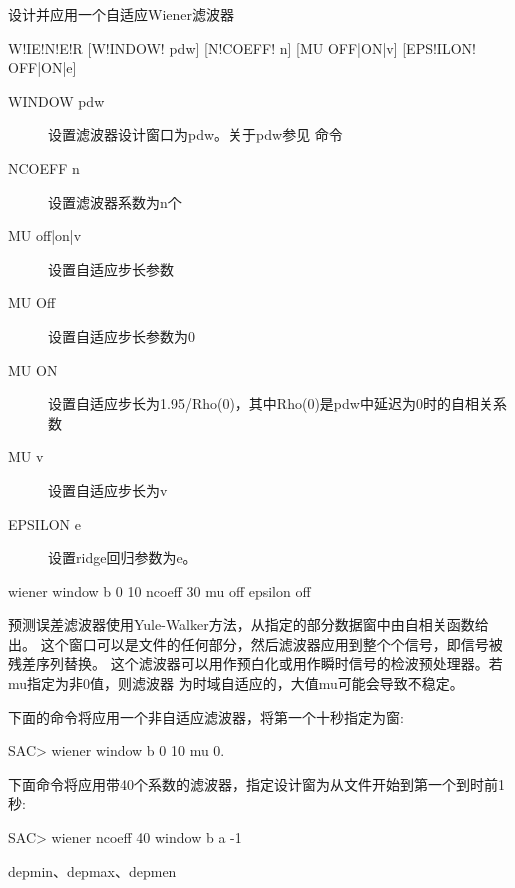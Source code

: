 \label{cmd:wiener}

设计并应用一个自适应Wiener滤波器

\begin{SACSTX}
W!IE!N!E!R [W!INDOW! pdw] [N!COEFF! n] [MU OFF|ON|v] [EPS!ILON! OFF|ON|e]
\end{SACSTX}

\begin{description}
\item [WINDOW pdw] 设置滤波器设计窗口为pdw。关于pdw参见  命令
\item [NCOEFF n] 设置滤波器系数为n个
\item [MU off|on|v] 设置自适应步长参数
\item [MU Off] 设置自适应步长参数为0
\item [MU ON] 设置自适应步长为1.95/Rho(0)，其中Rho(0)是pdw中延迟为0时的自相关系数
\item [MU v] 设置自适应步长为v
\item [EPSILON e] 设置ridge回归参数为e。
\end{description}

\begin{SACDFT}
wiener window b 0 10 ncoeff 30 mu off epsilon off
\end{SACDFT}

预测误差滤波器使用Yule-Walker方法，从指定的部分数据窗中由自相关函数给出。
这个窗口可以是文件的任何部分，然后滤波器应用到整个个信号，即信号被残差序列替换。
这个滤波器可以用作预白化或用作瞬时信号的检波预处理器。若mu指定为非0值，则滤波器
为时域自适应的，大值mu可能会导致不稳定。

下面的命令将应用一个非自适应滤波器，将第一个十秒指定为窗:
\begin{SACCode}
SAC> wiener window b 0 10 mu 0.
\end{SACCode}

下面命令将应用带40个系数的滤波器，指定设计窗为从文件开始到第一个到时前1秒:
\begin{SACCode}
SAC> wiener ncoeff 40 window b a -1
\end{SACCode}

depmin、depmax、depmen

